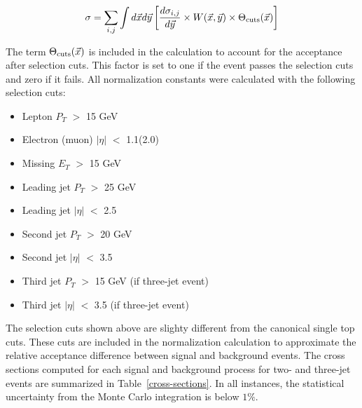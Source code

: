 \begin{equation}
\label{cross}
\sigma = \sum_{i,j} \int d\vec{x}d\vec{y}
\left[ \frac{d\sigma_{i,j}}{d\vec{y}}
\times W(\vec{x},\vec{y})
\times \Theta_{\rm{cuts}}(\vec{x})
\right]
\end{equation}

The term $\Theta_{\rm{cuts}}(\vec{x})$ is included in the calculation to account for the acceptance after selection cuts. This factor is set to one if the event passes the selection cuts and zero if it fails. All normalization constants were calculated with the following selection cuts:

\begin{itemize}
\item Lepton $P_{T}$ $>$ 15 GeV
\item Electron (muon) $|\eta|$ $<$ 1.1(2.0)
\item Missing $E_{T}$ $>$ 15 GeV
\item Leading jet $P_{T}$ $>$ 25 GeV
\item Leading jet $|\eta|$ $<$ 2.5
\item Second jet $P_{T}$ $>$ 20 GeV
\item Second jet $|\eta|$ $<$ 3.5
\item Third jet $P_{T}$ $>$ 15 GeV (if three-jet event)
\item Third jet $|\eta|$ $<$ 3.5 (if three-jet event)
\end{itemize}

The selection cuts shown above are slighty different from the
canonical single top cuts. These cuts are included in the
normalization calculation to approximate the relative acceptance
difference between signal and background events. The cross sections
computed for each signal and background process for two- and three-jet
events are summarized in Table~\ref{cross-sections}. In all instances,
the statistical uncertainty from the Monte Carlo integration is below
$1\%$.

